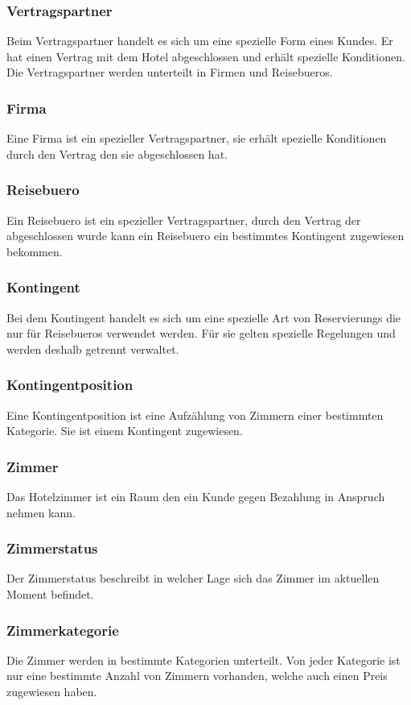 \documentclass[10pt,a4paper,titlepage]{article}
\begin{document}
\subsubsection{\Gls{Vertragspartner}}
Beim \Gls{Vertragspartner} handelt es sich um eine spezielle Form eines \Glspl{Kunde}.
Er hat einen Vertrag mit dem Hotel abgeschlossen und erhält spezielle Konditionen. Die \Gls{Vertragspartner} werden unterteilt in Firmen und \Glspl{Reisebuero}.
\subsubsection{Firma}
Eine Firma ist ein spezieller \Gls{Vertragspartner}, sie erhält spezielle Konditionen
durch den Vertrag den sie abgeschlossen hat.
\subsubsection{\Gls{Reisebuero}}
Ein \Gls{Reisebuero} ist ein spezieller \Gls{Vertragspartner}, durch den Vertrag der
abgeschlossen wurde kann ein \Gls{Reisebuero} ein bestimmtes \Gls{Kontingent}
zugewiesen bekommen.
\subsubsection{\Gls{Kontingent}}
Bei dem \Gls{Kontingent} handelt es sich um eine spezielle Art von \Glspl{Reservierung} die nur für \Glspl{Reisebuero} verwendet werden. Für sie gelten spezielle Regelungen und werden deshalb getrennt verwaltet.
\subsubsection{Kontingentposition}
Eine Kontingentposition ist eine Aufzählung von \Gls{Zimmer}n einer bestimmten
Kategorie. Sie ist einem \Gls{Kontingent} zugewiesen.
\subsubsection{\Gls{Zimmer}}
Das Hotelzimmer ist ein Raum den ein Kunde gegen Bezahlung in Anspruch nehmen kann.
\subsubsection{Zimmerstatus}
Der Zimmerstatus beschreibt in welcher Lage sich das \Gls{Zimmer} im aktuellen Moment befindet.
\subsubsection{Zimmerkategorie}
Die \Gls{Zimmer} werden in bestimmte Kategorien unterteilt. Von jeder Kategorie ist
nur eine bestimmte Anzahl von \Gls{Zimmer}n vorhanden, welche auch einen Preis
zugewiesen haben.
\end{document}
